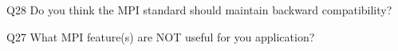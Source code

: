 \begin{description}%
\item{Q28} Do you think the MPI standard should maintain backward compatibility?%
\item{Q27} What MPI feature(s) are NOT useful for you application?%
\end{description}%
